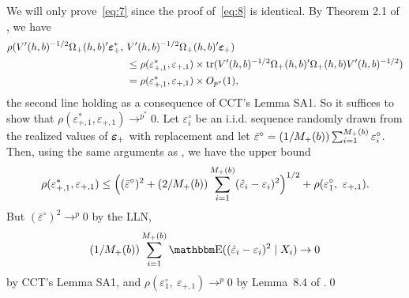 \documentclass[12pt,fleqn]{article}
\begin{document}
We will only prove~\eqref{eq:7} since the proof of~\eqref{eq:8} is
identical. By Theorem 2.1 of \cite{freedman1981}, we have
\begin{align*}
  \rho(V'(h,b)^{-1/2} \Omega_+(h,b)'\epb_{+}^{*},\
  &V'(h,b)^{-1/2} \Omega_+(h,b)'\epb_{+}) \\
  &\leq \rho(\varepsilon_{+,1}^{*}, \varepsilon_{+,1}) \times
    \tr(V'(h,b)^{-1/2} \Omega_+(h,b)' \Omega_+(h,b)V'(h,b)^{-1/2}) \\
  &= \rho(\varepsilon_{+,1}^{*}, \varepsilon_{+,1}) \times O_{p^{*}}(1),
\end{align*}
the second line holding as a consequence of CCT's Lemma SA1. So it suffices
to show that $\rho(\varepsilon_{+,1}^{*}, \varepsilon_{+,1}) \to^{p^{*}} 0$. Let
$\varepsilon^\circ_i$ be an i.i.d. sequence randomly drawn from the
realized values of $\epb_+$ with replacement and let
$\bar{\varepsilon}^\circ = (1/M_+(b)) \osum[+]{i}{b} \varepsilon^\circ_i$. Then,
using the same arguments as \cite{freedman1981}, we have the upper bound
\begin{equation*}
  \rho(\varepsilon_{+,1}^*, \varepsilon_{+,1})
  \leq
  \Big((\bar\varepsilon^{\circ})^2 +
  (2/M_+(b)) \osum[+]{i}{b} (\hat\varepsilon_i - \varepsilon_i)^2\Big)^{1/2}
  + \rho(\varepsilon^\circ_1,\ \varepsilon_{+,1}).
\end{equation*}
But $(\bar\varepsilon^{\circ})^2 \to^p 0$ by the LLN,
\[
  (1/M_+(b)) \osum[+]{i}{b}
  \E((\hat\varepsilon_i - \varepsilon_i)^2 \mid X_i) \to 0
\]
by CCT's Lemma SA1, and
$\rho(\varepsilon_1^\circ,\ \varepsilon_{+,1}) \to^p 0$ by Lemma~8.4 of
\cite{bickel1981}.\qed

\clearpage


\end{document}

